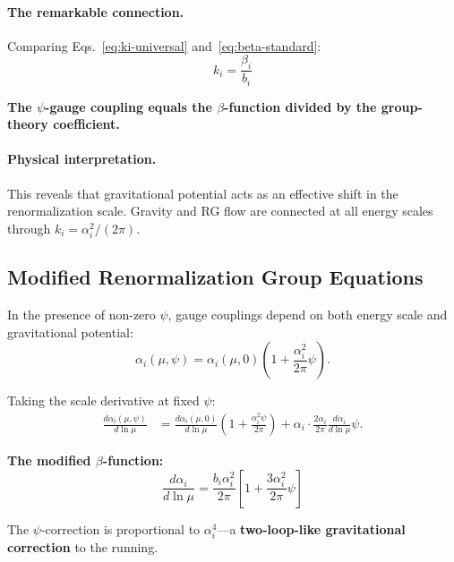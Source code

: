 \paragraph{The remarkable connection.}
Comparing Eqs.~\eqref{eq:ki-universal} and~\eqref{eq:beta-standard}:
\begin{equation}\label{eq:ki-beta}
\boxed{k_i = \frac{\beta_i}{b_i}}
\end{equation}

\textbf{The $\psi$-gauge coupling equals the $\beta$-function divided by the group-theory coefficient.}

\paragraph{Physical interpretation.}
This reveals that gravitational potential acts as an effective shift in the renormalization scale. Gravity and RG flow are connected at all energy scales through $k_i = \alpha_i^2/(2\pi)$.

\subsection{Modified Renormalization Group Equations}\label{sec:gauge-rg}

In the presence of non-zero $\psi$, gauge couplings depend on both energy scale and gravitational potential:
\begin{equation}
\alpha_i(\mu, \psi) = \alpha_i(\mu, 0)\left(1 + \frac{\alpha_i^2}{2\pi}\psi\right).
\end{equation}

Taking the scale derivative at fixed $\psi$:
\begin{align}
\frac{d\alpha_i(\mu,\psi)}{d\ln\mu} &= \frac{d\alpha_i(\mu,0)}{d\ln\mu}
\left(1 + \frac{\alpha_i^2\psi}{2\pi}\right) 
+ \alpha_i \cdot \frac{2\alpha_i}{2\pi}\frac{d\alpha_i}{d\ln\mu}\psi.
\end{align}

\textbf{The modified $\beta$-function:}
\begin{equation}\label{eq:beta-modified}
\boxed{\frac{d\alpha_i}{d\ln\mu} = \frac{b_i\alpha_i^2}{2\pi}
\left[1 + \frac{3\alpha_i^2}{2\pi}\psi\right]}
\end{equation}

The $\psi$-correction is proportional to $\alpha_i^4$---a \textbf{two-loop-like gravitational correction} to the running.

